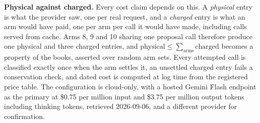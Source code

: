 \textbf{Physical against charged.} Every cost claim depends on this. A
\emph{physical} entry is what the provider saw, one per real request, and a
\emph{charged} entry is what an arm would have paid, one per arm per call it would
have made, including calls served from cache. Arms 8, 9 and 10 sharing one
proposal call therefore produce one physical and three charged entries, and
$\text{physical} \le \sum_{\text{arms}} \text{charged}$ becomes a property of the
books, asserted over random arm sets. Every attempted call is classified exactly
once when the arm settles it, an unsettled charged entry fails a conservation
check, and dated cost is computed at log time from the registered price table. The configuration is cloud-only, with a hosted Gemini
Flash endpoint as the primary at \$0.75 per million input and \$3.75 per million
output tokens including thinking tokens, retrieved 2026-09-06, and a different
provider for confirmation.
